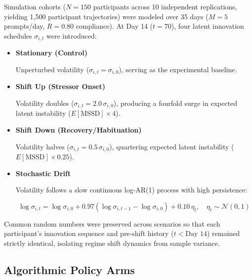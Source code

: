 \documentclass[11pt,letterpaper]{article}
\begin{document}
Simulation cohorts ($N = 150$ participants across 10 independent replications, yielding 1,500 participant trajectories) were modeled over 35 days ($M = 5$ prompts/day, $R = 0.80$ compliance). At Day 14 ($t = 70$), four latent innovation schedules $\sigma_{i,t}$ were introduced:
\begin{itemize}
    \item \textbf{Stationary (Control)} 
    
    Unperturbed volatility ($\sigma_{i,t} = \sigma_{i,0}$), serving as the experimental baseline.
    
    \item \textbf{Shift Up (Stressor Onset)} 
    
    Volatility doubles ($\sigma_{i,t} = 2.0\,\sigma_{i,0}$), producing a fourfold surge in expected latent instability ($E[\text{MSSD}] \times 4$).
    
    \item \textbf{Shift Down (Recovery/Habituation)} 
    
    Volatility halves ($\sigma_{i,t} = 0.5\,\sigma_{i,0}$), quartering expected latent instability ($E[\text{MSSD}] \times 0.25$).
    
    \item \textbf{Stochastic Drift} 
    
    Volatility follows a slow continuous log-AR(1) process with high persistence:
    
    \begin{equation}
    \log \sigma_{i,t} = \log \sigma_{i,0} + 0.97 (\log \sigma_{i,t-1} - \log \sigma_{i,0}) + 0.10\, \eta_t, \quad \eta_t \sim \mathcal{N}(0, 1)
    \end{equation}
\end{itemize}
Common random numbers were preserved across scenarios so that each participant's innovation sequence and pre-shift history ($t < \text{Day } 14$) remained strictly identical, isolating regime shift dynamics from sample variance.

\subsection{Algorithmic Policy Arms}
\end{document}
